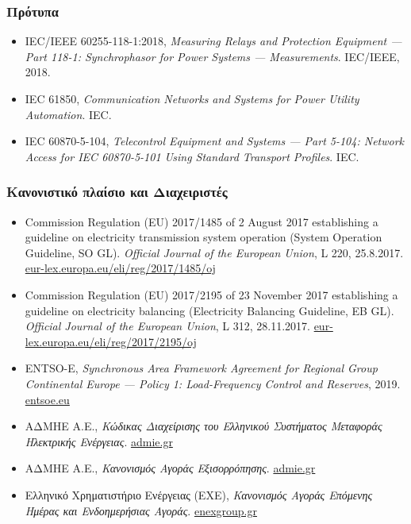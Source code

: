 \subsubsection*{Πρότυπα}

\begin{itemize}
\item IEC/IEEE 60255-118-1:2018, \textit{Measuring Relays and Protection Equipment ---
      Part 118-1: Synchrophasor for Power Systems --- Measurements}. IEC/IEEE, 2018.
\item IEC 61850, \textit{Communication Networks and Systems for Power Utility Automation}. IEC.
\item IEC 60870-5-104, \textit{Telecontrol Equipment and Systems --- Part 5-104: Network
      Access for IEC 60870-5-101 Using Standard Transport Profiles}. IEC.
\end{itemize}

\subsubsection*{Κανονιστικό πλαίσιο και Διαχειριστές}

\begin{itemize}
\item Commission Regulation (EU) 2017/1485 of 2 August 2017 establishing a guideline on
      electricity transmission system operation (System Operation Guideline, SO GL).
      \textit{Official Journal of the European Union}, L 220, 25.8.2017.
      \href{https://eur-lex.europa.eu/eli/reg/2017/1485/oj}{eur-lex.europa.eu/eli/reg/2017/1485/oj}
\item Commission Regulation (EU) 2017/2195 of 23 November 2017 establishing a guideline on
      electricity balancing (Electricity Balancing Guideline, EB GL). \textit{Official Journal
      of the European Union}, L 312, 28.11.2017.
      \href{https://eur-lex.europa.eu/eli/reg/2017/2195/oj}{eur-lex.europa.eu/eli/reg/2017/2195/oj}
\item ENTSO-E, \textit{Synchronous Area Framework Agreement for Regional Group Continental
      Europe --- Policy 1: Load-Frequency Control and Reserves}, 2019.
      \href{https://www.entsoe.eu/}{entsoe.eu}
\item ΑΔΜΗΕ Α.Ε., \textit{Κώδικας Διαχείρισης του Ελληνικού Συστήματος Μεταφοράς Ηλεκτρικής
      Ενέργειας}. \href{https://www.admie.gr/}{admie.gr}
\item ΑΔΜΗΕ Α.Ε., \textit{Κανονισμός Αγοράς Εξισορρόπησης}. \href{https://www.admie.gr/}{admie.gr}
\item Ελληνικό Χρηματιστήριο Ενέργειας (ΕΧΕ), \textit{Κανονισμός Αγοράς Επόμενης Ημέρας και
      Ενδοημερήσιας Αγοράς}. \href{https://www.enexgroup.gr/}{enexgroup.gr}
\end{itemize}

